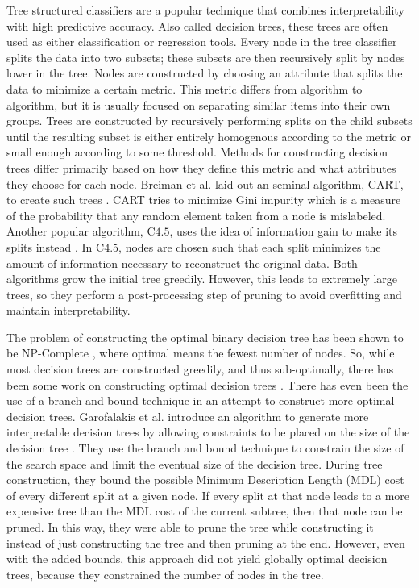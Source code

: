 Tree structured classifiers are a popular technique that combines interpretability with high predictive accuracy.
Also called decision trees, these trees are often used as either classification or regression tools.
Every node in the tree classifier splits the data into two subsets; these subsets are then recursively split by nodes lower in the tree.
Nodes are constructed by choosing an attribute that splits the data to minimize a certain metric.
This metric differs from algorithm to algorithm, but it is usually focused on separating similar items into their own groups.%
Trees are constructed by recursively performing splits on the child subsets until the resulting subset is either entirely homogenous according to the metric or small enough according to some threshold.
Methods for constructing decision trees differ primarily based on how they define this metric and what attributes they choose for each node.
Breiman et al. laid out an seminal algorithm, CART, to create such trees \cite{BreimanFrOlSt84}.
CART tries to minimize Gini impurity which is a measure of the probability that any random element taken from a node is mislabeled.
Another popular algorithm, C$4.5$, uses the idea of information gain to make its splits instead \cite{Quinlan93}.
In C$4.5$, nodes are chosen such that each split minimizes the amount of information necessary to reconstruct the original data.
Both algorithms grow the initial tree greedily.
However, this leads to extremely large trees, so they perform a post-processing step of pruning to avoid overfitting and maintain interpretability.

The problem of constructing the optimal binary decision tree has been shown to be NP-Complete \cite{HyafilRi76}, where optimal means the fewest number of nodes.
So, while most decision trees are constructed greedily, and thus sub-optimally, there has been some work on constructing optimal decision trees \cite{Moret82}.
There has even been the use of a branch and bound technique in an attempt to construct more optimal decision trees.
Garofalakis et al. introduce an algorithm to generate more interpretable decision trees by allowing constraints to be placed on the size of the decision tree \cite{GarofalakisHyRaSh00}.
They use the branch and bound technique to constrain the size of the search space and limit the eventual size of the decision tree.
During tree construction, they bound the possible Minimum Description Length (MDL) cost of every different split at a given node.
If every split at that node leads to a more expensive tree than the MDL cost of the current subtree, then that node can be pruned.
In this way, they were able to prune the tree while constructing it instead of just constructing the tree and then pruning at the end.
However, even with the added bounds, this approach did not yield globally optimal decision trees, because they constrained the number of nodes in the tree.

